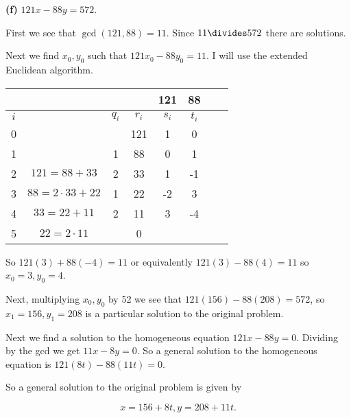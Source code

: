 \documentclass[oneside,12pt]{amsart}
\begin{document}
\textbf{(f)} $121x - 88y = 572$.

First we see that $\gcd(121,88) = 11$. Since $11\divides 572$ there are solutions.

Next we find $x_0,y_0$ such that $121x_0 - 88y_0 = 11$. I will use the extended Euclidean algorithm.

\begin{tabular}{|c|c|c|c|c|c|c|c|}
\hline
\quad & \quad               & \quad   & \quad & 121     & 88   \\ \hline
$i$   & \quad               & $q_{i}$ & $r_i$ & $s_i$  & $t_i$ \\ \hline\hline
0     & \quad               & \quad   & 121   &  1     & 0     \\ \hline
1     & \quad               & 1       &  88   &  0     & 1     \\ \hline
2     & $121=88+33$         & 2       &  33   &  1     &-1     \\ \hline
3     & $ 88=2\cdot33+22$   & 1       &  22   & -2     & 3     \\ \hline
4     & $ 33=22+11$         & 2       &  11   &  3     &-4     \\ \hline
5     & $ 22=2\cdot 11$     &         &   0   &        &       \\ \hline
\end{tabular}

So $121(3) + 88 (-4) = 11$ or equivalently $121(3) - 88 (4) = 11$
so $x_0=3, y_0=4$.

Next, multiplying $x_0,y_0$ by 52 we see that
$121(156) - 88(208) = 572$, so $x_1=156, y_1=208$ is a particular solution
to the original problem.

Next we find a solution to the homogeneous equation $121x-88y=0$. Dividing by
the gcd we get $11x-8y=0$. So a general solution to the homogeneous equation is
$121(8t) - 88(11t)=0.$

So a general solution to the original problem is given by

$$x=156+8t, y=208+11t.$$
\end{document}
